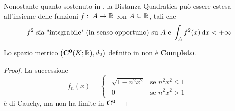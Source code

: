 \begin{observation}
	Nonostante quanto sostenuto in , la Distanza Quadratica può essere estesa all'insieme delle funzioni $f:\; A \to \mathbb{R}$ con $A \subseteq \mathbb{R}$, tali che
	\[f^2 \text{ sia "integrabile" (in senso opportuno) su } A \text{ e } \int_{A} f^2(x) \,\mathrm{d}{x} < +\infty\]
\end{observation}
\begin{proposition}
	\label{prop:dist_quad_sp_metr_non_compl}
	Lo spazio metrico $\bigl( \mathbf{C^{0}}(K; \mathbb{R}), d_2 \bigr)$ definito in  non è \textbf{Completo}.
	\begin{proof}
		La successione
		\[
			f_n(x) =
			\begin{cases}
				\begin{array}{ll}
					\sqrt{1-n^2x^2} & \text{se } n^2x^2 \leq 1\\
					0 & \text{se } n^2x^2 > 1
				\end{array}
			\end{cases}
		\]
		è di Cauchy, ma non ha limite in $\mathbf{C^{0}}$.


\end{proof}
\end{proposition}
